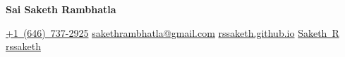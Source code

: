 \documentclass[10pt, letterpaper]{article}
\newenvironment{header}{
        \setlength{\topsep}{0pt}\par\kern\topsep\centering\color{primaryColor}\linespread{1.5}
    }{
        \par\kern\topsep
    } %
\newcommand{\placelastupdatedtext}{%
  \AddToShipoutPictureFG*{%
    \put(
        \LenToUnit{\paperwidth-2 cm-0.2 cm+0.05cm},
        \LenToUnit{\paperheight-1.0 cm}
    )
  }%
}%
\let\hrefWithoutArrow\href
\renewcommand{\href}[2]{\hrefWithoutArrow{#1}{\mbox{\ifthenelse{\equal{#2}{}}{ }{#2 }\raisebox{.15ex}{\footnotesize \faExternalLink*}}}}
\begin{document}
    \placelastupdatedtext
    \begin{header}
        \fontsize{20 pt}{20 pt}
        \textbf{Sai Saketh Rambhatla}

        \vspace{0.3 cm}

        \normalsize
        \mbox{\hrefWithoutArrow{tel:+1(646)7372925}{{\footnotesize\faPhone*}\hspace*{0.13cm}+1 (646) 737-2925}}
        \hspace*{0.5 cm}
        \mbox{\hrefWithoutArrow{mailto:sakethrambhatla@gmail.com}{{\small\faEnvelope[regular]}\hspace*{0.13cm}sakethrambhatla@gmail.com}}
        \hspace*{0.5 cm}
        \mbox{\hrefWithoutArrow{https://rssaketh.github.io/}{{\small\faLink}\hspace*{0.13cm}rssaketh.github.io}}
        \hspace*{0.5 cm}
        \mbox{\hrefWithoutArrow{https://scholar.google.com/citations?user=VRyNTogAAAAJ&hl=en}{{\small\faGraduationCap}\hspace*{0.13cm}Saketh R}}
        \hspace*{0.5 cm}
        \mbox{\hrefWithoutArrow{https://www.linkedin.com/in/rssaketh/}{{\small\faLinkedinIn}\hspace*{0.13cm}rssaketh}}
    \end{header}

    \vspace{0.3 cm}



\end{document}
